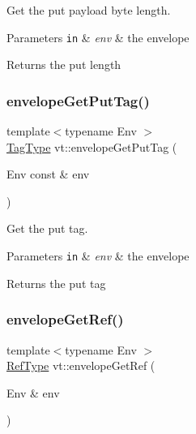 Get the put payload byte length. 


\begin{DoxyParams}[1]{Parameters}
\mbox{\tt in}  & {\em env} & the envelope\\
\hline
\end{DoxyParams}
\begin{DoxyReturn}{Returns}
the put length 
\end{DoxyReturn}
\mbox{\label{namespacevt_aaf50340390d58fe42775ae5b8e413f28}} 
\subsubsection{\texorpdfstring{envelope\+Get\+Put\+Tag()}{envelopeGetPutTag()}}
{\footnotesize\ttfamily template$<$typename Env $>$ \\
\hyperlink{namespacevt_a84ab281dae04a52a4b243d6bf62d0e52}{Tag\+Type} vt\+::envelope\+Get\+Put\+Tag (\begin{DoxyParamCaption}\item[{Env const \&}]{env }\end{DoxyParamCaption})\hspace{0.3cm}{\ttfamily [inline]}}



Get the put tag. 


\begin{DoxyParams}[1]{Parameters}
\mbox{\tt in}  & {\em env} & the envelope\\
\hline
\end{DoxyParams}
\begin{DoxyReturn}{Returns}
the put tag 
\end{DoxyReturn}
\mbox{\label{namespacevt_ad664e6e94c1ea309344adad1c3fb291c}} 
\subsubsection{\texorpdfstring{envelope\+Get\+Ref()}{envelopeGetRef()}}
{\footnotesize\ttfamily template$<$typename Env $>$ \\
\hyperlink{namespacevt_a9b39ce9494bb04674d0d5b895a5aa50f}{Ref\+Type} vt\+::envelope\+Get\+Ref (\begin{DoxyParamCaption}\item[{Env \&}]{env }\end{DoxyParamCaption})\hspace{0.3cm}{\ttfamily [inline]}}



